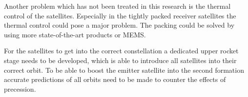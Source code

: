 Another problem which has not been treated in this research is the thermal control of the satellites. Especially in the tightly packed receiver satellites the thermal control could pose a major problem. The packing could be solved by using more state-of-the-art products or \ac{MEMS}.

For the satellites to get into the correct constellation a dedicated upper rocket stage needs to be developed, which is able to introduce all satellites into their correct orbit. To be able to boost the emitter satellite into the second formation accurate predictions of all orbits need to be made to counter the effects of precession.


